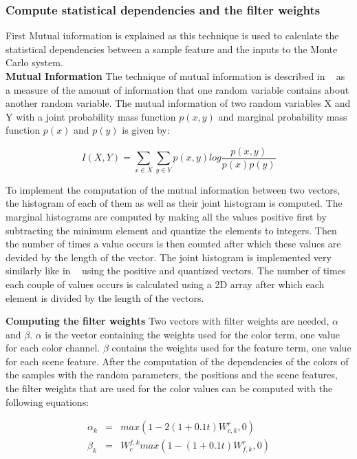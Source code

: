 \subsubsection{Compute statistical dependencies and the filter weights}
First Mutual information is explained as this technique is used to calculate the statistical dependencies between a sample feature and the inputs to the Monte Carlo system.
\\

\textbf{Mutual Information}
The technique of mutual information is described in ~\cite{cover2006elements} as a measure of the amount of information that one random variable contains about another random variable.
The mutual information of two random variables X and Y with a joint probability mass function $p(x,y)$ and marginal probability mass function $p(x)$ and $p(y)$ is given by:

\[
 I(X,Y) = \sum_{x\in X} \sum_{y\in Y} p(x,y)log\frac{p(x,y)}{p(x)p(y)}
\]

To implement the computation of the mutual information between two vectors, the histogram of each of them as well as their joint histogram is computed.
The marginal histograms are computed by making all the values positive first by subtracting the minimum element and quantize the elements to integers.
Then the number of times a value occurs is then counted after which these values are devided by the length of the vector.
The joint histogram is implemented very similarly like in ~\cite{jointhistogram} using the positive and quantized vectors.
The number of times each couple of values occurs is calculated using a 2D array after which each element is divided by the length of the vectors.

\textbf{Computing the filter weights}
Two vectors with filter weights are needed, $\alpha$ and $\beta$.
$\alpha$ is the vector containing the weights used for the color term, one value for each color channel.
$\beta$ contains the weights used for the feature term, one value for each scene feature.
After the computation of the dependencies of the colors of the samples with the random parameters, the positions and the scene features, the filter weights that are used for the color values can be computed with the following equations:

\begin{equation}
 \begin{aligned}
 \alpha_k &=& max(1-2(1+0.1t)W_{c,k}^{r},0) \\
 \beta_k &=& W_{c}^{f,k}max(1-(1+0.1t)W_{f,k}^{r}, 0)
 \end{aligned}
\end{equation}

